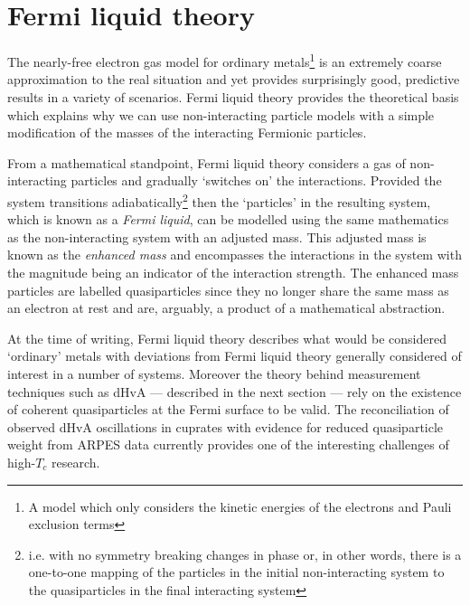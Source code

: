 

\section{Fermi liquid theory}

The nearly-free electron gas model for ordinary metals\footnote{A model which only considers the kinetic energies of the electrons and Pauli exclusion terms} is an extremely coarse approximation to the real situation and yet provides surprisingly good, predictive results in a variety of scenarios. Fermi liquid theory provides the theoretical basis which explains why we can use non-interacting particle models with a simple modification of the masses of the interacting Fermionic particles.

From a mathematical standpoint, Fermi liquid theory considers a gas of non-interacting particles and gradually `switches on' the interactions. Provided the system transitions adiabatically\footnote{i.e. with no symmetry breaking changes in phase or, in other words, there is a one-to-one mapping of the particles in the initial non-interacting system to the quasiparticles in the final interacting system} then the `particles' in the resulting system, which is known as a \emph{Fermi liquid}, can be modelled using the same mathematics as the non-interacting system with an adjusted mass. This adjusted mass is known as the \emph{enhanced mass} and encompasses the interactions in the system with the magnitude being an indicator of the interaction strength. The enhanced mass particles are labelled quasiparticles since they no longer share the same mass as an electron at rest and are, arguably, a product of a mathematical abstraction.

At the time of writing, Fermi liquid theory describes what would be considered `ordinary' metals with deviations from Fermi liquid theory generally considered of interest in a number of systems. Moreover the theory behind measurement techniques such as \ac{dHvA} --- described in the next section --- rely on the existence of coherent quasiparticles at the Fermi surface to be valid. The reconciliation of observed \ac{dHvA} oscillations in cuprates with evidence for reduced quasiparticle weight from \ac{ARPES} data currently provides one of the interesting challenges of high-$T_c$ research.
